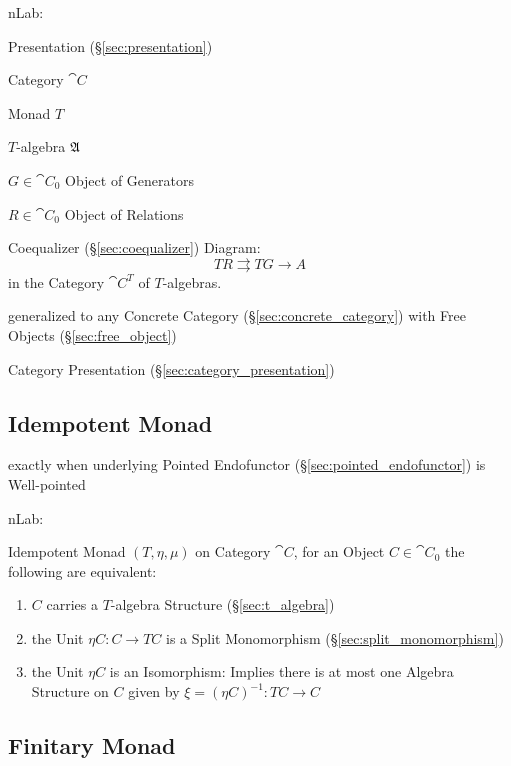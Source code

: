 nLab:

Presentation (\S\ref{sec:presentation})

Category $\cat{C}$

Monad $T$

$T$-algebra $\mathfrak{A}$

$G \in \cat{C}_0$ Object of Generators

$R \in \cat{C}_0$ Object of Relations

Coequalizer (\S\ref{sec:coequalizer}) Diagram:
\[
  T R \rightrightarrows T G \rightarrow A
\]
in the Category $\cat{C}^T$ of $T$-algebras. %

generalized to any Concrete Category (\S\ref{sec:concrete_category})
with Free Objects (\S\ref{sec:free_object}) %

Category Presentation (\S\ref{sec:category_presentation})



\subsection{Idempotent Monad}\label{sec:idempotent_monad}

exactly when underlying Pointed Endofunctor
(\S\ref{sec:pointed_endofunctor}) is Well-pointed

nLab:

Idempotent Monad $(T, \eta, \mu)$ on Category $\cat{C}$, for an Object
$C \in \cat{C}_0$ the following are equivalent:
\begin{enumerate}
  \item $C$ carries a $T$-algebra Structure (\S\ref{sec:t_algebra})
  \item the Unit $\eta C : C \rightarrow T C$ is a Split Monomorphism
    (\S\ref{sec:split_monomorphism})
  \item the Unit $\eta C$ is an Isomorphism: Implies there is at most
    one Algebra Structure on $C$ given by $\xi = (\eta C)^{-1} : T C
    \rightarrow C$ %
\end{enumerate}



\subsection{Finitary Monad}\label{sec:finitary_monad}

